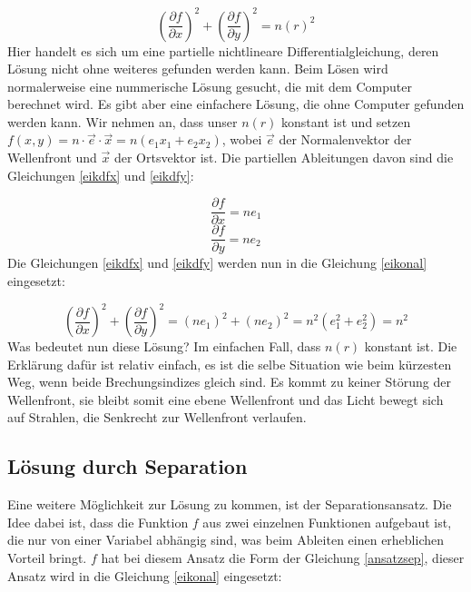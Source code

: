 \begin{refsection}
\begin{equation}\label{eikonal}
\left( \dfrac{\partial f}{\partial x}\right)^{2} + \left( \dfrac{\partial f}{\partial y}\right) ^{2} = n(r)^{2}
\end{equation}
Hier handelt  es sich um eine partielle nichtlineare Differentialgleichung, deren Lösung nicht ohne weiteres gefunden werden kann. Beim Lösen wird normalerweise eine nummerische Lösung gesucht, die mit dem Computer berechnet wird. Es gibt aber eine einfachere Lösung, die ohne Computer gefunden werden kann. Wir nehmen an, dass unser $n(r)$ konstant ist und setzen $f(x,y)=n\cdot\vec{e}\cdot\vec{x}= n(e_{1}x_{1}+e_{2}x_{2})$, wobei $\vec{e}$ der Normalenvektor der Wellenfront und $\vec{x}$ der Ortsvektor ist. Die partiellen Ableitungen davon sind die Gleichungen \eqref{eikdfx} und \eqref{eikdfy}:

\begin{equation}\label{eikdfx}
\dfrac{\partial f}{\partial x} = ne_{1}
\end{equation}
\begin{equation}\label{eikdfy}
\dfrac{\partial f}{\partial y} = ne_{2}
\end{equation}
Die Gleichungen \eqref{eikdfx} und \eqref{eikdfy} werden nun in die Gleichung \eqref{eikonal} eingesetzt:

\begin{equation}\label{lösung_eik}
\left( \dfrac{\partial f}{\partial x}\right)^{2} + \left( \dfrac{\partial f}{\partial y}\right) ^{2} = \left( ne_{1}\right) ^{2}+\left( ne_{2}\right)^{2}=n^{2}(e_{1}^{2}+e_{2}^{2})=n^{2}
\end{equation}
Was bedeutet nun diese Lösung? Im einfachen Fall, dass $n(r)$ konstant ist. Die Erklärung dafür ist relativ einfach, es ist die selbe Situation wie beim kürzesten Weg, wenn beide Brechungsindizes gleich sind. Es kommt zu keiner Störung der Wellenfront, sie bleibt somit eine ebene Wellenfront und das Licht bewegt sich auf Strahlen, die Senkrecht zur Wellenfront verlaufen.

\subsection{Lösung durch Separation}
Eine weitere Möglichkeit zur Lösung zu kommen, ist der Separationsansatz. Die Idee dabei ist, dass die Funktion $f$ aus zwei einzelnen Funktionen aufgebaut ist, die nur von einer Variabel abhängig sind, was beim Ableiten einen erheblichen Vorteil bringt. $f$ hat bei diesem Ansatz die Form der Gleichung \eqref{ansatzsep}, dieser Ansatz wird in die Gleichung \eqref{eikonal} eingesetzt:  


\end{refsection}
